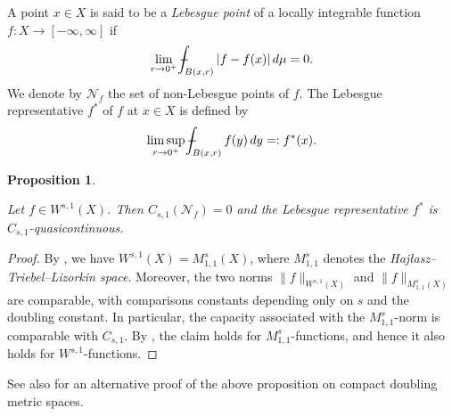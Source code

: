 \documentclass[11pt,leqno]{amsart}
\def\Xint#1{\mathchoice
	{\XXint\displaystyle\textstyle{#1}}
	{\XXint\textstyle\scriptstyle{#1}}
	{\XXint\scriptstyle\scriptscriptstyle{#1}}
	{\XXint\scriptscriptstyle\scriptscriptstyle{#1}}
	\!\int}
\def\XXint#1#2#3{{\setbox0=\hbox{$#1{#2#3}{\int}$ }
		\vcenter{\hbox{$#2#3$ }}\kern-.6\wd0}}
\def\dashint{\Xint-}
\newtheorem{proposition}[theorem]{Proposition}
\numberwithin{equation}{section}
\theoremstyle{definition}
\begin{document}
	A point $x\in X$ is said to be a \emph{Lebesgue point} of a locally integrable function $f:X\to[-\infty,\infty]$
	if 
	\begin{equation}\label{eq3.34-14dec}
		\lim_{r\to 0^+}\dashint_{ B(x,r)}|f-
		{ f(x)}
		|\,d\mu=0.
	\end{equation}
	We denote by $\mathcal N_{f}$ the set of non-Lebesgue points of $f$.
	The Lebesgue representative $f^*$ of $f$ at $x\in X$ is defined by
	\[
	\limsup_{r\to0^+}\dashint_{B(x,r)}f(y)\,dy=:f^*(x).
	\]
	
	
	
	\begin{proposition}\label{prop:quasi.-rep.}
		
		Let  $f\in W^{s,1}(X)$.
		Then $C_{s,1}(\mathcal N_f)=0$ and 
		the Lebesgue representative  $f^*$ is $C_{s,1}$-quasicontinuous.
	\end{proposition}
	
	\begin{proof}
		By \cite[Proposition~4.1]{KYZ10}, we have $W^{s,1}(X) = M^{s}_{1,1}(X)$,
		where $M^{s}_{1,1}$ denotes the \emph{Haj{\l}asz--Triebel--Lizorkin space}.
		Moreover, the two norms  $\|f\|_{W^{s,1}(X)}$
		and $\|f\|_{M^{s}_{1,1}(X)}$ are comparable, with comparisons constants depending only
		on $s$ and the doubling constant.
		In particular, the capacity associated with the $M^{s}_{1,1}$-norm is comparable with
		$C_{s,1}$.
		By \cite[Theorem~8.1]{HKT17}, the claim holds for $M^{s}_{1,1}$-functions, and hence it also holds for $W^{s,1}$-functions.
	\end{proof}
	See also \cite[Corollary~1.2]{BBS22} for an alternative proof of the above proposition
	on compact doubling metric spaces.
	
\end{document}
